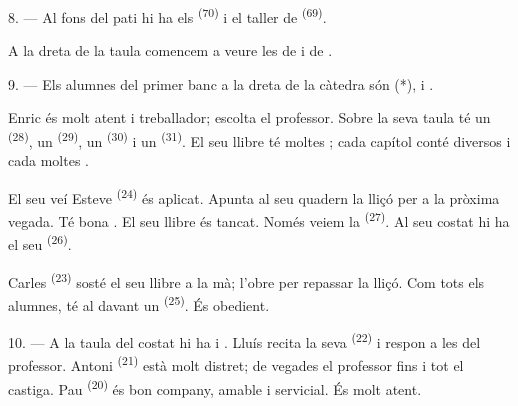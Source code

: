 8. --- Al fons del pati hi ha els 
\textsuperscript{(70)} i el taller de 
\textsuperscript{(69)}.

A la dreta de la taula comencem a veure les  de  i
de .


\VUsaut{2.4mm}

\VUsaut{3.0mm}

9. --- Els alumnes del primer banc a la dreta de la càtedra són 
(*),  i .

Enric és molt atent i treballador; escolta el professor. Sobre la seva taula té
un  \textsuperscript{(28)}, un 
\textsuperscript{(29)}, un  \textsuperscript{(30)} i un
 \textsuperscript{(31)}. El seu llibre té moltes
; cada capítol conté diversos  i cada
 moltes .

El seu veí Esteve \textsuperscript{(24)} és aplicat. Apunta al seu quadern la
lliçó per a la pròxima vegada. Té bona . El seu llibre és tancat.
Només veiem la  \textsuperscript{(27)}. Al seu costat hi ha el
seu  \textsuperscript{(26)}.

Carles \textsuperscript{(23)} sosté el seu llibre a la mà; l'obre per repassar la
lliçó. Com tots els alumnes, té al davant un 
\textsuperscript{(25)}. És obedient.

10. --- A la taula del costat hi ha  i . Lluís
recita la seva  \textsuperscript{(22)} i respon a les
 del professor. Antoni \textsuperscript{(21)} està molt
distret; de vegades el professor fins i tot el castiga. Pau
\textsuperscript{(20)} és bon company, amable i servicial. És molt atent.

